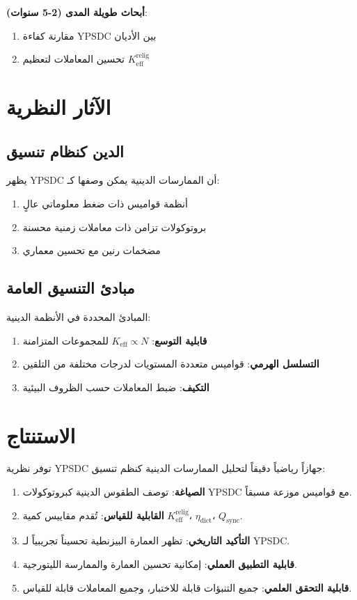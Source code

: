 \documentclass[12pt,a4paper]{article}
\begin{document}
	\textbf{أبحاث طويلة المدى (2-5 سنوات)}:
	\begin{enumerate}
		\item مقارنة كفاءة YPSDC بين الأديان
		\item تحسين المعاملات لتعظيم $K_{\mathrm{eff}}^{\mathrm{relig}}$
	\end{enumerate}
	
	\section{الآثار النظرية}
	
	\subsection{الدين كنظام تنسيق}
	
	يظهر YPSDC أن الممارسات الدينية يمكن وصفها كـ:
	\begin{enumerate}
		\item أنظمة قواميس ذات ضغط معلوماتي عالٍ
		\item بروتوكولات تزامن ذات معاملات زمنية محسنة
		\item مضخمات رنين مع تحسين معماري
	\end{enumerate}
	
	\subsection{مبادئ التنسيق العامة}
	
	المبادئ المحددة في الأنظمة الدينية:
	\begin{enumerate}
		\item \textbf{قابلية التوسع}: $K_{\mathrm{eff}} \propto N$ للمجموعات المتزامنة
		\item \textbf{التسلسل الهرمي}: قواميس متعددة المستويات لدرجات مختلفة من التلقين
		\item \textbf{التكيف}: ضبط المعاملات حسب الظروف البيئية
	\end{enumerate}
	
	\section{الاستنتاج}
	
	توفر نظرية YPSDC جهازاً رياضياً دقيقاً لتحليل الممارسات الدينية كنظم تنسيق:
	
	\begin{enumerate}
		\item \textbf{الصياغة}: توصف الطقوس الدينية كبروتوكولات YPSDC مع قواميس موزعة مسبقاً.
		\item \textbf{القابلية للقياس}: تُقدم مقاييس كمية $K_{\mathrm{eff}}^{\mathrm{relig}}$، $\eta_{\mathrm{dict}}$، $Q_{\mathrm{sync}}$.
		\item \textbf{التأكيد التاريخي}: تظهر العمارة البيزنطية تحسيناً تجريبياً لـ YPSDC.
		\item \textbf{قابلية التطبيق العملي}: إمكانية تحسين العمارة والممارسة الليتورجية.
		\item \textbf{قابلية التحقق العلمي}: جميع التنبؤات قابلة للاختبار، وجميع المعاملات قابلة للقياس.
	\end{enumerate}
	
\end{document}
